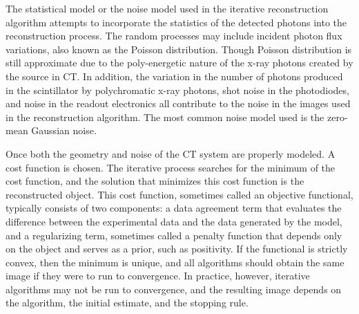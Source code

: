 The statistical model or the noise model used in the iterative reconstruction algorithm attempts to incorporate the statistics of the detected photons into the reconstruction process.  The random processes may include incident photon flux variations, also known as the Poisson distribution.  Though Poisson distribution is still approximate due to the poly-energetic nature of the x-ray photons created by the source in CT.  In addition, the variation in the number of photons produced in the scintillator by polychromatic x-ray photons, shot noise in the photodiodes, and noise in the readout electronics all contribute to the noise in the images used in the reconstruction algorithm.  The most common noise model used is the zero-mean Gaussian noise.

Once both the geometry and noise of the CT system are properly modeled.  A cost function is chosen.  The iterative process searches for the minimum of the cost function, and the solution that minimizes this cost function is the reconstructed object.  This cost function, sometimes called an objective functional, typically consists of two components: a data agreement term that evaluates the difference between the experimental data and the data generated by the model, and a regularizing term, sometimes called a penalty function that depends only on the object and serves as a prior, such as positivity.  If the functional is strictly convex, then the minimum is unique, and all algorithms should obtain the same image if they were to run to convergence.  In practice, however, iterative algorithms may not be run to convergence, and the resulting image depends on the algorithm, the initial estimate, and the stopping rule.


